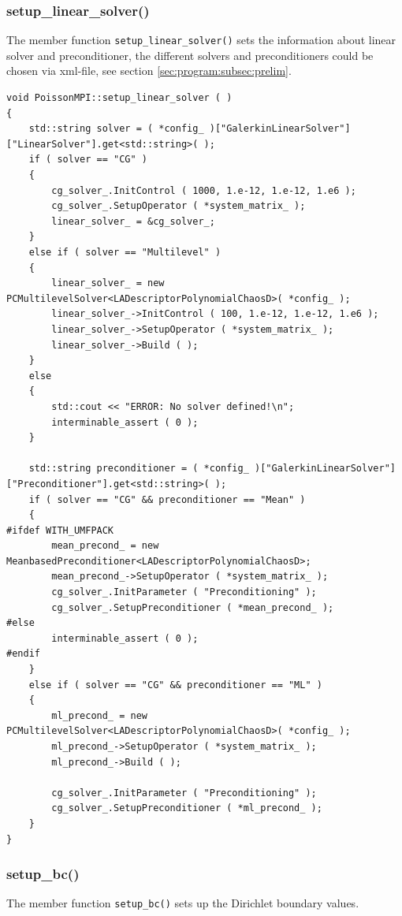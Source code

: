\documentclass{article}
\begin{document}
\subsubsection{setup\_linear\_solver()}

The member function \texttt{setup\_linear\_solver()} sets the information about linear solver and preconditioner, the different solvers and preconditioners could be chosen via xml-file, see section \ref{sec:program:subsec:prelim}.

\begin{lstlisting}
void PoissonMPI::setup_linear_solver ( )
{
    std::string solver = ( *config_ )["GalerkinLinearSolver"]["LinearSolver"].get<std::string>( );
    if ( solver == "CG" )
    {
        cg_solver_.InitControl ( 1000, 1.e-12, 1.e-12, 1.e6 );
        cg_solver_.SetupOperator ( *system_matrix_ );
        linear_solver_ = &cg_solver_;
    }
    else if ( solver == "Multilevel" )
    {
        linear_solver_ = new PCMultilevelSolver<LADescriptorPolynomialChaosD>( *config_ );
        linear_solver_->InitControl ( 100, 1.e-12, 1.e-12, 1.e6 );
        linear_solver_->SetupOperator ( *system_matrix_ );
        linear_solver_->Build ( );
    }
    else
    {
        std::cout << "ERROR: No solver defined!\n";
        interminable_assert ( 0 );
    }

    std::string preconditioner = ( *config_ )["GalerkinLinearSolver"]["Preconditioner"].get<std::string>( );
    if ( solver == "CG" && preconditioner == "Mean" )
    {
#ifdef WITH_UMFPACK
        mean_precond_ = new MeanbasedPreconditioner<LADescriptorPolynomialChaosD>;
        mean_precond_->SetupOperator ( *system_matrix_ );
        cg_solver_.InitParameter ( "Preconditioning" );
        cg_solver_.SetupPreconditioner ( *mean_precond_ );
#else
        interminable_assert ( 0 );
#endif
    }
    else if ( solver == "CG" && preconditioner == "ML" )
    {
        ml_precond_ = new PCMultilevelSolver<LADescriptorPolynomialChaosD>( *config_ );
        ml_precond_->SetupOperator ( *system_matrix_ );
        ml_precond_->Build ( );

        cg_solver_.InitParameter ( "Preconditioning" );
        cg_solver_.SetupPreconditioner ( *ml_precond_ );
    }
}
\end{lstlisting}

\subsubsection{setup\_bc()}

The member function \texttt{setup\_bc()} sets up the Dirichlet boundary values.
\end{document}
